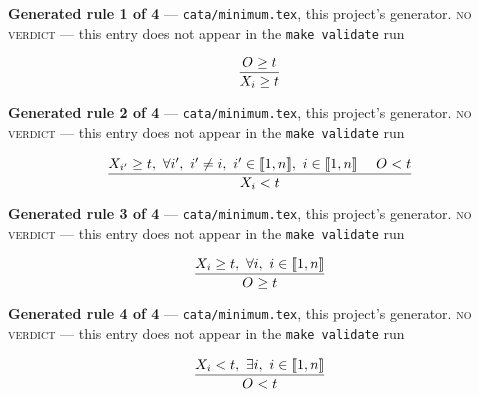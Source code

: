 \documentclass[10pt,a4paper]{article}
\newcommand{\rulebox}[1]{%
  \[\resizebox{\ifdim\width>\linewidth\linewidth\else\width\fi}{!}%
    {$\displaystyle #1$}\]}
\begin{document}
{\small\textbf{Generated rule 1 of 4} --- \texttt{cata/minimum.tex}, this project's generator. \textsc{no verdict} --- this entry does not appear in the \texttt{make validate} run\par}
\rulebox{\frac{O_{} \geq t}{X_{i} \geq t}}

{\small\textbf{Generated rule 2 of 4} --- \texttt{cata/minimum.tex}, this project's generator. \textsc{no verdict} --- this entry does not appear in the \texttt{make validate} run\par}
\rulebox{\frac{X_{i'} \geq t,~\forall i',~i' \neq i,~i' \in \llbracket1,n\rrbracket,~i \in \llbracket1,n\rrbracket~~~~O_{}<t}{X_{i}<t}}

{\small\textbf{Generated rule 3 of 4} --- \texttt{cata/minimum.tex}, this project's generator. \textsc{no verdict} --- this entry does not appear in the \texttt{make validate} run\par}
\rulebox{\frac{X_{i} \geq t,~\forall i,~i \in \llbracket1,n\rrbracket}{O_{} \geq t}}

{\small\textbf{Generated rule 4 of 4} --- \texttt{cata/minimum.tex}, this project's generator. \textsc{no verdict} --- this entry does not appear in the \texttt{make validate} run\par}
\rulebox{\frac{X_{i}<t,~\exists i,~i \in \llbracket1,n\rrbracket}{O_{}<t}}
\end{document}

